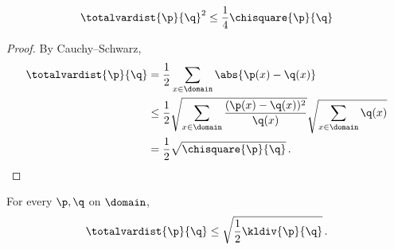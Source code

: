 \tbc
{}
\begin{lemma}
  \label{app:distances:chi2:tv}
  \[
    \totalvardist{\p}{\q}^2 \leq \frac{1}{4}\chisquare{\p}{\q}
  \]
\end{lemma}
\begin{proof}
  By Cauchy--Schwarz, 
  \begin{align*}
      \totalvardist{\p}{\q} &= \frac{1}{2}\sum_{x\in\domain} \abs{\p(x)-\q(x)} \\
      &\leq \frac{1}{2}\sqrt{\sum_{x\in\domain} \frac{(\p(x)-\q(x))^2}{\q(x)}}\sqrt{\sum_{x\in\domain} \q(x)} \\
      &= \frac{1}{2}\sqrt{\chisquare{\p}{\q}}\,.
  \end{align*}
\end{proof}

\begin{lemma}
  \label{lemma:pinsker}
For every $\p,\q$ on $\domain$, 
\begin{equation}
  \label{eq:pinsker}
  \totalvardist{\p}{\q} \leq \sqrt{\frac{1}{2}\kldiv{\p}{\q}}\,.
\end{equation}
\end{lemma}